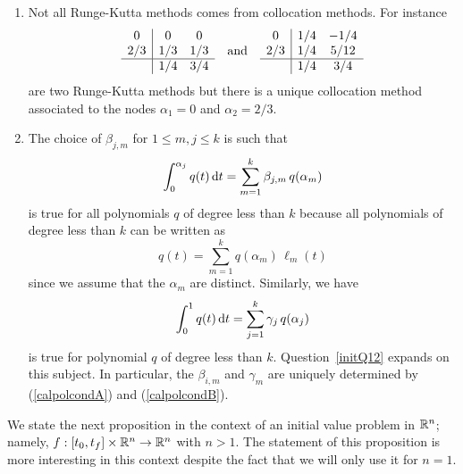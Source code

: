 \begin{rmkList}\label{RKcolInterpol}
\begin{enumerate}
\item Not all Runge-Kutta methods comes from collocation methods.  For
instance
\[
\begin{array}{c|cc}
0 & 0 & 0 \\
2/3 & 1/3 & 1/3 \\
\hline
 & 1/4 & 3/4
\end{array}
\quad\text{and} \quad
\begin{array}{c|cc}
0 & 1/4 & -1/4 \\
2/3 & 1/4 & 5/12 \\
\hline
 & 1/4 & 3/4
\end{array}
\]
are two Runge-Kutta methods but there is a unique collocation method
associated to the nodes $\alpha_1 =0$ and $\alpha_2 = 2/3$.
\item The choice of $\beta_{j,m}$ for $1 \leq m,j\leq k$ is such that
\begin{equation}\label{calpolcondA}
\int_0^{\alpha_j} q(t) \,\mathrm{d}t = \sum_{m=1}^k \beta_{j,m}\, q(\alpha_m)
\end{equation}
is true for all polynomials $q$ of degree less than $k$ because all
polynomials of degree less than $k$ can be written as
\[
  q(t) = \sum_{m=1}^k q(\alpha_m)\, \ell_m(t)
\]
since we assume that the $\alpha_m$ are distinct.  Similarly, we have
\begin{equation}\label{calpolcondB}
\int_0^1 q(t) \,\mathrm{d}t = \sum_{j=1}^k \gamma_j\, q(\alpha_j)
\end{equation}
is true for polynomial $q$ of degree less than $k$.
Question~\ref{initQ12} expands on this subject.  In particular, the
$\beta_{i,m}$ and $\gamma_m$ are uniquely determined by
(\ref{calpolcondA}) and (\ref{calpolcondB}).
\end{enumerate}
\end{rmkList}

We state the next proposition in the context of an initial value
problem in $\mathbb{R}^n$; namely, $f:[t_0,t_f]\times \mathbb{R}^n \to \mathbb{R}^n$ with
$n>1$.  The statement of this proposition is more interesting in this
context despite the fact that we will only use it for $n=1$. 

